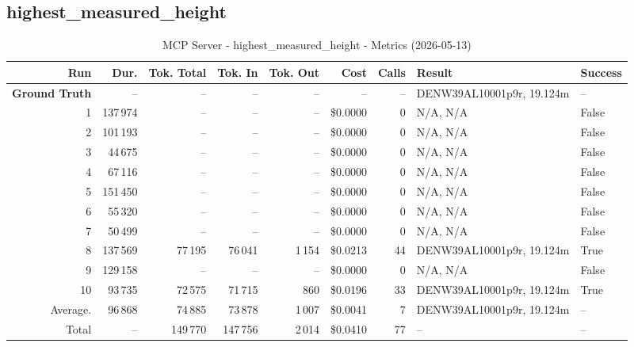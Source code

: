 \documentclass[a4paper,11pt]{article}
\begin{document}
\clearpage
\subsection{highest\_measured\_height}

\begin{table}[ht]
\centering
\scriptsize
\caption{MCP Server - highest\_measured\_height - Metrics (2026-05-13)}
\label{tab:mcp\_highest\_measured\_height\_metrics\_2026-05-13}
\begin{tabular}{r r r r r r r p{3cm} l}
\hline
Run & Dur. & Tok. Total & Tok. In & Tok. Out & Cost & Calls & Result & Success \\
\hline
\textbf{Ground Truth} & -- & -- & -- & -- & -- & -- & DENW39AL10001p9r, 19.124m & -- \\
\hline
1 & 137\,974 & -- & -- & -- & \$0.0000 & 0 & N/A, N/A & False \\
2 & 101\,193 & -- & -- & -- & \$0.0000 & 0 & N/A, N/A & False \\
3 & 44\,675 & -- & -- & -- & \$0.0000 & 0 & N/A, N/A & False \\
4 & 67\,116 & -- & -- & -- & \$0.0000 & 0 & N/A, N/A & False \\
5 & 151\,450 & -- & -- & -- & \$0.0000 & 0 & N/A, N/A & False \\
6 & 55\,320 & -- & -- & -- & \$0.0000 & 0 & N/A, N/A & False \\
7 & 50\,499 & -- & -- & -- & \$0.0000 & 0 & N/A, N/A & False \\
8 & 137\,569 & 77\,195 & 76\,041 & 1\,154 & \$0.0213 & 44 & DENW39AL10001p9r, 19.124m & True \\
9 & 129\,158 & -- & -- & -- & \$0.0000 & 0 & N/A, N/A & False \\
10 & 93\,735 & 72\,575 & 71\,715 & 860 & \$0.0196 & 33 & DENW39AL10001p9r, 19.124m & True \\
\hline
Average. & 96\,868 & 74\,885 & 73\,878 & 1\,007 & \$0.0041 & 7 & DENW39AL10001p9r, 19.124m & -- \\
Total & -- & 149\,770 & 147\,756 & 2\,014 & \$0.0410 & 77 & -- & -- \\
\hline
\end{tabular}
\end{table}

\clearpage
\end{document}
